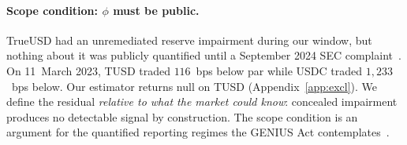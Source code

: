 \paragraph{Scope condition: $\phi$ must be public.} TrueUSD had an unremediated reserve impairment
during our window, but nothing about it was publicly quantified until a September 2024 SEC
complaint~\cite{sectruecoin2024}. On 11~March 2023, TUSD traded
$116$~bps below par while USDC traded $1{,}233$~bps below. Our estimator returns null on TUSD
(Appendix~\ref{app:excl}). We define the residual \emph{relative to what the market could know}:
concealed impairment produces no detectable signal by construction. The scope condition is an argument for the quantified reporting regimes the GENIUS Act contemplates~\cite{geniusact2025}.
